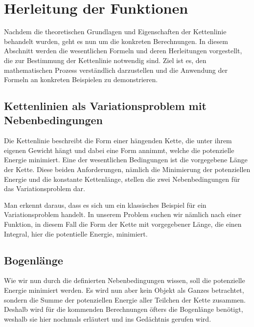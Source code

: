%
%
%
%
\section{Herleitung der Funktionen\label{kettenlinie:section:Herleitung der Funktionen}}
Nachdem die theoretischen Grundlagen und Eigenschaften der Kettenlinie behandelt wurden, geht es nun um die konkreten Berechnungen.
In diesem Abschnitt werden die wesentlichen Formeln und deren Herleitungen vorgestellt, die zur Bestimmung der Kettenlinie notwendig sind.
Ziel ist es, den mathematischen Prozess verständlich darzustellen und die Anwendung der Formeln an konkreten Beispielen zu demonstrieren.

\subsection{Kettenlinien als Variationsproblem mit Nebenbedingungen
\label{kettenlinie:subsection:Kettenlinien als Variationsproblem}}
Die Kettenlinie beschreibt die Form einer hängenden Kette, die unter ihrem eigenen Gewicht hängt und dabei eine Form annimmt, welche die potenzielle Energie minimiert.
Eine der wesentlichen Bedingungen ist die vorgegebene Länge der Kette.
Diese beiden Anforderungen, nämlich die Minimierung der potenziellen Energie und die konstante Kettenlänge, stellen die zwei Nebenbedingungen für das Variationsproblem dar.

Man erkennt daraus, dass es sich um ein klassisches Beispiel für ein Variationsproblem handelt.
In unserem Problem suchen wir nämlich nach einer Funktion, in diesem Fall die Form der Kette mit vorgegebener Länge, die einen Integral, hier die potentielle Energie, minimiert.

\subsection{Bogenlänge
\label{kettenlinie:subsection:Bogenlänge}}
Wie wir nun durch die definierten Nebenbedingungen wissen, soll die potenzielle Energie minimiert werden.
Es wird nun aber kein Objekt als Ganzes betrachtet, sondern die Summe der potenziellen Energie aller Teilchen der Kette zusammen.
Deshalb wird für die kommenden Berechnungen öfters die Bogenlänge benötigt, weshalb sie hier nochmals erläutert und ins Gedächtnis gerufen wird.

